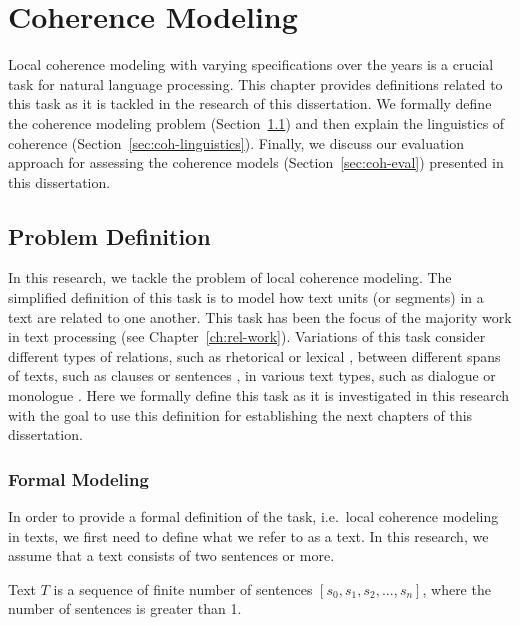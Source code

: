 
\chapter{Coherence Modeling}
\label{ch:coherence}

Local coherence modeling with varying specifications over the years is a crucial task for natural language processing. 
This chapter provides definitions related to this task as it is tackled in the research of this dissertation. 
We formally define the coherence modeling problem (Section~\ref{sec:coh-def}) and then explain the linguistics of coherence (Section~\ref{sec:coh-linguistics}). 
Finally, we discuss our evaluation approach for assessing the coherence models (Section~\ref{sec:coh-eval}) presented in this dissertation.   


\section{Problem Definition}
\label{sec:coh-def}

In this research, we tackle the problem of local coherence modeling. 
The simplified definition of this task is to model how text units (or segments) in a text are related to one another. 
This task has been the focus of the majority work in text processing (see Chapter~\ref{ch:rel-work}). 
Variations of this task consider different types of relations, such as rhetorical \cite{hovyeduard89} or lexical \cite{morris91}, between different spans of texts, such as clauses \cite{strube.col98} or sentences \cite{halliday76}, in various text types, such as dialogue \cite{wangxinhao13} or monologue \cite{barzilay08}. 
Here we formally define this task as it is investigated in this research with the goal to use this definition for establishing the next chapters of this dissertation. 

\subsection{Formal Modeling}

In order to provide a formal definition of the task, i.e.\ local coherence modeling in texts, we first need to define what we refer to as a text. 
In this research, we assume that a text consists of two sentences or more.  

\begin{definition}
Text $T$ is a sequence of finite number of sentences $[s_0, s_1, s_2, ..., s_n]$, where the number of sentences is greater than 1.   
\end{definition}

